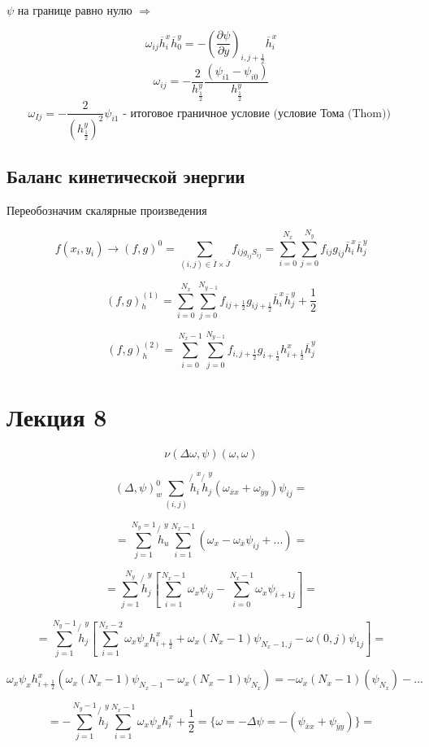 \documentclass[12pt, a4paper]{article}
\begin{document}
$ \psi $ на границе равно нулю $ \Rightarrow $

\[ \omega_{ij} \overline{h}^x_i \overline{h}^y_0 = -(\frac{\partial \psi}{\partial y})_{i,j+\frac{1}{2}} \overline{h}^x_i \]
\[ \omega_{ij} = -\frac{2}{h^y_{\frac{1}{2}}} \frac{(\psi_{i1} - \psi_{i0})}{h^y_{\frac{1}{2}}} \]
\[ \omega_{Ij} = -\frac{2}{{(h^y_\frac{1}{2})}^2} \psi_{i1} \textrm{ - итоговое граничное условие (условие Тома (Thom)) } \]

\subsection{Баланс кинетической энергии}

Переобозначим скалярные произведения

\[ f(x_i, y_i) \rightarrow {(f,g)}^0 = \sum_{(i,j) \in \overline{I} \times \overline{J}}^{} f_{ij g_{ij}S_{ij}} = \sum_{i=0}^{N_x}\sum_{j=0}^{N_y} f_{ij} g_{ij} \overline{h}^x_i \overline{h}^y_j \]

\[ (f,g)_h^{(1)} = \sum_{i=0}^{N_x} \sum_{j=0}^{N_{y-1}} f_{ij+\frac{1}{2}} g_{ij+\frac{1}{2}} \overline{h}^x_i \overline{h}^y_j+\frac{1}{2} \]

\[ {(f,g)}^{(2)}_h = \sum_{i=0}^{N_x-1} \sum_{j=0}^{N_{y-1}} f_{i, j+\frac{1}{2}} g_{i+\frac{1}{2}} h^x_{i+\frac{1}{2}} \overline{h}^y_j \]


\section{Лекция 8}

\[ \nu(\Delta \omega, \psi)(\omega, \omega) \]

\[ (\Delta, \psi)^0_w \sum_{(i,j)}^{} \not{h}_i^x \not{h}_j^y(\omega_{\overline{x}x}+\omega_{\overline{y}y}) \psi_{ij}= \]

\[ = \sum_{j=1}^{N_y=1} \not{h}^y_u\sum_{i=1}^{N_x-1} (\omega_x - \omega_{\overline{x}} \psi_{ij}+...) = \]

\[ = \sum_{j=1}^{N_y} \not{h}_j^y [\sum_{i=1}^{N_x-1} \omega_x \psi_{ij}-\sum_{i=0}^{N_x-1}\omega_x \psi_{i+1j}] = \]

\[ = \sum_{j=1}^{N_y-1} \not{h}^y_j [\sum_{i=1}^{N_x-2} \omega_x \psi_x h^x_{i+\frac{1}{2}}+ \omega_x (N_x-1)\psi_{N_x-1,j}-\omega(0, j) \psi_{1j}] = \]

\[ \omega_x \psi_x h_{i+\frac{1}{2}}^x (\omega_x (N_x-1) \psi_{N_x-1} - \omega_x(N_x-1) \psi_{N_x}) = -\omega_x (N_x-1) (\psi_{N_x})- ... \]

\[ = - \sum_{j=1}^{N_y-1} \not{h}^y_j \sum_{i=1}^{N_x-1} \omega_x \psi_x h^x_i+\frac{1}{2} = \{\omega = - \Delta \psi = - (\psi_{\overline{x}x}+ \psi_{\overline{y}y})\} = \]
\end{document}
